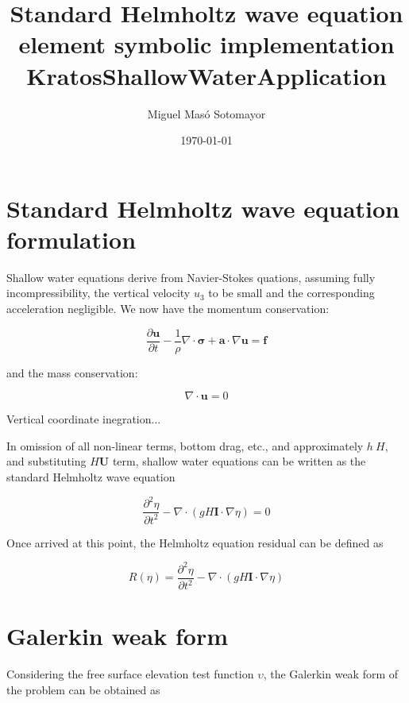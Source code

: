 \documentclass[a4paper,12pt]{article}
\title{Standard Helmholtz wave equation element symbolic implementation \\
             {KratosShallowWaterApplication}}
\author{Miguel Masó Sotomayor}
\date{\today}
\begin{document}
\maketitle



\section{Standard Helmholtz wave equation formulation}

Shallow water equations derive from Navier-Stokes quations, assuming fully incompressibility, the vertical velocity $u_{3}$ to be small and the corresponding acceleration negligible. We now have the momentum conservation:

\begin{equation}
\frac{\partial\mathbf{u}}{\partial t} - 
\frac{1}{\rho}\nabla\cdot\mathbf{\sigma} + 
\mathbf{a}\cdot\nabla\mathbf{u} = 
\mathbf{f}
\end{equation}

and the mass conservation:

\begin{equation}
\nabla\cdot\mathbf{u} = 0
\end{equation}

Vertical coordinate inegration...

In omission of all non-linear terms, bottom drag, etc., and approximately $h~H$, and substituting $H\mathbf{U}$ term, shallow water equations can be written as the standard Helmholtz wave equation

\begin{equation}
\frac{\partial^{2}\eta}{\partial t^{2}} - 
\nabla\cdot\left(
	gH\mathbf{I}\cdot\nabla\eta
\right) = 0
\end{equation} 

Once arrived at this point, the Helmholtz equation residual can be defined as

\begin{equation}
R\left(\eta	\right) = 
\frac{\partial^{2}\eta}{\partial t^{2}} - 
\nabla\cdot\left(
	gH\mathbf{I}\cdot\nabla\eta
\right)
\end{equation}



\section{Galerkin weak form}

Considering the free surface elevation test function $\upsilon$, the
Galerkin weak form of the problem can be obtained as
\end{document}
